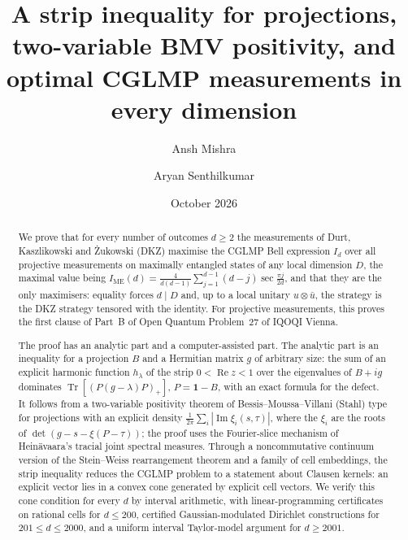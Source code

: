 \documentclass[11pt]{amsart}
\theoremstyle{definition}
\theoremstyle{remark}
\numberwithin{equation}{section}
\newcommand{\Tr}{\operatorname{Tr}}
\renewcommand{\Re}{\operatorname{Re}}
\renewcommand{\Im}{\operatorname{Im}}
\newcommand{\IME}{I_{\mathrm{ME}}}
\newcommand{\one}{\mathbf{1}}
\begin{document}
\title[Optimal CGLMP measurements in every dimension]{A strip inequality for projections, two-variable BMV positivity,
and optimal CGLMP measurements in every dimension}

\author{Ansh Mishra}
\author{Aryan Senthilkumar}

\date{October 2026}



\begin{abstract}
We prove that for every number of outcomes $d\ge2$ the measurements of Durt, Kaszlikowski and \.Zukowski (DKZ)
maximise the CGLMP Bell expression $I_d$ over all projective measurements on maximally entangled states of any local
dimension $D$, the maximal value being $\IME(d)=\frac4{d(d-1)}\sum_{j=1}^{d-1}(d-j)\sec\frac{\pi j}{2d}$, and that
they are the only maximisers: equality forces $d\mid D$ and, up to a local unitary $u\otimes\bar u$, the strategy
is the DKZ strategy tensored with the identity. For projective measurements, this proves the first clause of Part~B of
Open Quantum Problem~27 of IQOQI Vienna.

The proof has an analytic part and a computer-assisted part. The analytic part is an inequality for a projection
$B$ and a Hermitian matrix $g$ of arbitrary size: the sum of an explicit harmonic function $h_\lambda$ of the strip
$0<\Re z<1$ over the eigenvalues of $B+ig$ dominates $\Tr[(P(g-\lambda)P)_+]$, $P=\one-B$, with an exact formula for
the defect. It follows from a two-variable positivity theorem of Bessis--Moussa--Villani (Stahl) type for
projections with an explicit density $\frac1{2\pi}\sum_i|\Im\xi_i(s,\tau)|$, where the $\xi_i$ are the roots of
$\det(g-s-\xi(P-\tau))$; the proof uses the Fourier-slice mechanism of Hein\"avaara's tracial joint spectral
measures. Through a noncommutative continuum version of the Stein--Weiss rearrangement theorem and a family of cell
embeddings, the strip inequality reduces the CGLMP problem to a statement about Clausen kernels: an explicit vector
lies in a convex cone generated by explicit cell vectors. We verify this cone condition for every $d$ by interval
arithmetic, with linear-programming certificates on rational cells for $d\le200$, certified Gaussian-modulated
Dirichlet constructions for $201\le d\le2000$, and a uniform interval Taylor-model argument for $d\ge2001$.


\end{abstract}
\end{document}
